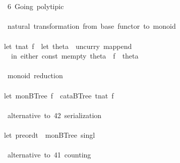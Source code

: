 \documentclass[a4paper]{article}
\begin{document}
\begin{tabbing}
\ttfamily ~\\
\ttfamily ~\\
\ttfamily ~~6~Going~polytipic~\\
\ttfamily ~\\
\ttfamily ~~natural~transformation~from~base~functor~to~monoid\\
\ttfamily ~\\
\ttfamily ~let~tnat~f~~let~theta~~uncurry~mappend~\\
\ttfamily ~~~in~either~const~mempty~theta~~f~~theta\\
\ttfamily ~~~\\
\ttfamily ~~monoid~reduction~\\
\ttfamily ~\\
\ttfamily ~let~monBTree~f~~cataBTree~tnat~f\\
\ttfamily ~\\
\ttfamily ~~alternative~to~42~serialization~\\
\ttfamily ~\\
\ttfamily ~let~preordt~~monBTree~singl\\
\ttfamily ~\\
\ttfamily ~~alternative~to~41~counting~\\

\end{tabbing}
\end{document}
